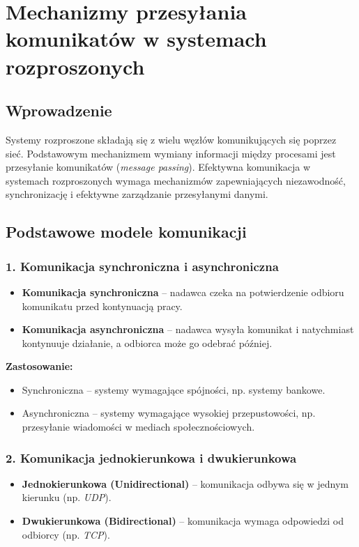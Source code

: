 \section{Mechanizmy przesyłania komunikatów w systemach rozproszonych}

\subsection{Wprowadzenie}
Systemy rozproszone składają się z wielu węzłów komunikujących się poprzez sieć. Podstawowym mechanizmem wymiany informacji między procesami jest przesyłanie komunikatów (\textit{message passing}). Efektywna komunikacja w systemach rozproszonych wymaga mechanizmów zapewniających niezawodność, synchronizację i efektywne zarządzanie przesyłanymi danymi.

\subsection{Podstawowe modele komunikacji}

\subsubsection{1. Komunikacja synchroniczna i asynchroniczna}
\begin{itemize}
    \item \textbf{Komunikacja synchroniczna} – nadawca czeka na potwierdzenie odbioru komunikatu przed kontynuacją pracy.
    \item \textbf{Komunikacja asynchroniczna} – nadawca wysyła komunikat i natychmiast kontynuuje działanie, a odbiorca może go odebrać później.
\end{itemize}

\textbf{Zastosowanie:}
\begin{itemize}
    \item Synchroniczna – systemy wymagające spójności, np. systemy bankowe.
    \item Asynchroniczna – systemy wymagające wysokiej przepustowości, np. przesyłanie wiadomości w mediach społecznościowych.
\end{itemize}

\subsubsection{2. Komunikacja jednokierunkowa i dwukierunkowa}
\begin{itemize}
    \item \textbf{Jednokierunkowa (Unidirectional)} – komunikacja odbywa się w jednym kierunku (np. \textit{UDP}).
    \item \textbf{Dwukierunkowa (Bidirectional)} – komunikacja wymaga odpowiedzi od odbiorcy (np. \textit{TCP}).
\end{itemize}

